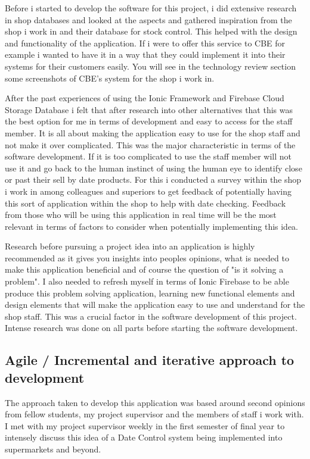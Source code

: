 Before i started to develop the software for this project, i did extensive research in shop databases and looked at the aspects and gathered inspiration from the shop i work in and their database for stock control. This helped with the design and functionality of the application. If i were to offer this service to CBE for example i wanted to have it in a way that they could implement it into their systems for their customers easily. You will see in the technology review section some screenshots of CBE's system for the shop i work in. 
\newline

After the past experiences of using the Ionic Framework and Firebase Cloud Storage Database i felt that after research into other alternatives that this was the best option for me in terms of development and easy to access for the staff member. It is all about making the application easy to use for the shop staff and not make it over complicated. This was the major characteristic in terms of the software development. If it is too complicated to use the staff member will not use it and go back to the human instinct of using the human eye to identify close or past their sell by date products. For this i conducted a survey within the shop i work in among colleagues and superiors to get feedback of potentially having this sort of application within the shop to help with date checking. Feedback from those who will be using this application in real time will be the most relevant in terms of factors to consider when potentially implementing this idea. 
\newline

Research before pursuing a project idea into an application is highly recommended as it gives you insights into peoples opinions, what is needed to make this application beneficial and of course the question of "is it solving a problem". I also needed to refresh myself in terms of Ionic Firebase to be able produce this problem solving application, learning new functional elements and design elements that will make the application easy to use and understand for the shop staff. This was a crucial factor in the software development of this project. Intense research was done on all parts before starting the software development.

\subsection{Agile / Incremental and iterative approach to development}
The approach taken to develop this application was based around second opinions from fellow students, my project supervisor and the members of staff i work with. I met with my project supervisor weekly in the first semester of final year to intensely discuss this idea of a Date Control system being implemented into supermarkets and beyond. \newline

